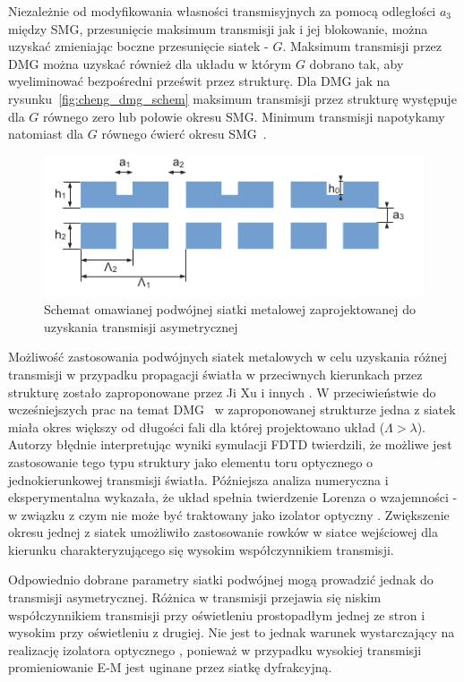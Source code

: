 Niezależnie od modyfikowania własności transmisyjnych za pomocą odległości $a_3$ między SMG, przesunięcie maksimum transmisji jak i jej blokowanie, można uzyskać zmieniając boczne przesunięcie siatek - $G$. Maksimum transmisji przez DMG można uzyskać również dla układu w którym $G$ dobrano tak, aby wyeliminować bezpośredni prześwit przez strukturę. Dla DMG jak na rysunku~\ref{fig:cheng_dmg_schem} maksimum transmisji przez strukturę występuje dla $G$ równego zero lub połowie okresu SMG. Minimum transmisji napotykamy natomiast dla $G$ równego ćwierć okresu SMG~\cite{chan2006optical}.

\begin{figure}[tb]
	\includegraphics[width=\textwidth]{images/thz/1D-DMG-schemat.png}
	\caption{Schemat omawianej podwójnej siatki metalowej zaprojektowanej do uzyskania transmisji asymetrycznej}
	\label{fig:1ddmg-schem}
\end{figure}


Możliwość zastosowania podwójnych siatek metalowych w celu uzyskania różnej transmisji w przypadku propagacji światła w przeciwnych kierunkach przez strukturę zostało zaproponowane przez Ji Xu i innych \cite{xu2011unidirectional}. W przeciwieństwie do wcześniejszych prac na temat DMG~\cite{cheng2007controllable,cheng2008physical,chan2006optical} w zaproponowanej strukturze jedna z siatek miała okres większy od długości fali dla której projektowano układ ($\Lambda>\lambda$). Autorzy błędnie interpretując wyniki symulacji FDTD twierdzili, że możliwe jest zastosowanie tego typu struktury jako elementu toru optycznego o jednokierunkowej transmisji światła. Późniejsza analiza numeryczna i eksperymentalna wykazała, że układ spełnia twierdzenie Lorenza o wzajemności - w związku z czym nie może być  traktowany jako izolator optyczny \cite{jalas2013and}. Zwiększenie okresu jednej z siatek umożliwiło zastosowanie rowków w siatce wejściowej dla kierunku charakteryzującego się wysokim współczynnikiem transmisji\cite{xu2011unidirectional}.

Odpowiednio dobrane parametry siatki podwójnej mogą prowadzić jednak do transmisji asymetrycznej. Różnica w transmisji przejawia się niskim współczynnikiem transmisji przy oświetleniu prostopadłym jednej ze stron i wysokim przy oświetleniu z drugiej. Nie jest to jednak warunek wystarczający na realizację izolatora optycznego \cite{jalas2013and}, ponieważ w przypadku wysokiej transmisji promieniowanie E-M jest uginane przez siatkę dyfrakcyjną. 

